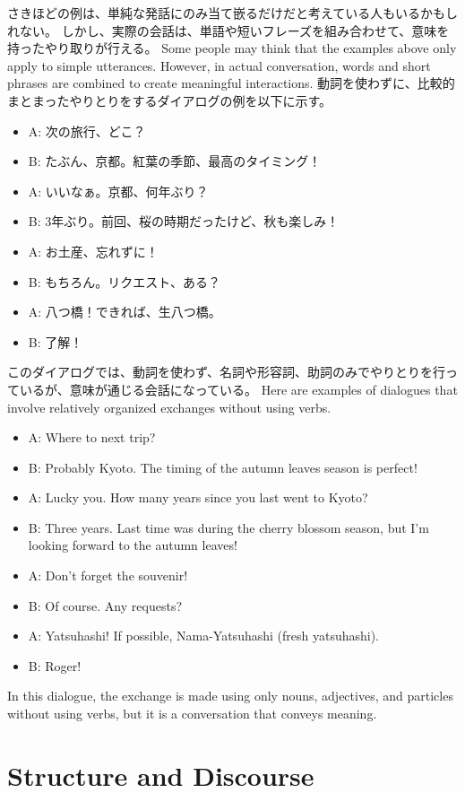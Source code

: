 \documentclass[uplatex,dvipdfmx,b5paper,english,10pt]{jsbook}
\begin{document}
\ifJapanese
  さきほどの例は、単純な発話にのみ当て嵌るだけだと考えている人もいるかもしれない。
  しかし、実際の会話は、単語や短いフレーズを組み合わせて、意味を持ったやり取りが行える。
\else
  Some people may think that the examples above only apply to simple utterances.
  However, in actual conversation, words and short phrases are combined to create meaningful interactions.
\fi
\ifJapanese
動詞を使わずに、比較的まとまったやりとりをするダイアログの例を以下に示す。
\begin{itemize}
  \item A: 次の旅行、どこ？
  \item B: たぶん、京都。紅葉の季節、最高のタイミング！
  \item A: いいなぁ。京都、何年ぶり？
  \item B: 3年ぶり。前回、桜の時期だったけど、秋も楽しみ！
  \item A: お土産、忘れずに！
  \item B: もちろん。リクエスト、ある？
  \item A: 八つ橋！できれば、生八つ橋。
  \item B: 了解！
\end{itemize}
このダイアログでは、動詞を使わず、名詞や形容詞、助詞のみでやりとりを行っているが、意味が通じる会話になっている。
\else
Here are examples of dialogues that involve relatively organized exchanges without using verbs.
\begin{itemize}
  \item A: Where to next trip?
  \item B: Probably Kyoto. The timing of the autumn leaves season is perfect!
  \item A: Lucky you. How many years since you last went to Kyoto?
  \item B: Three years. Last time was during the cherry blossom season, but I'm looking forward to the autumn leaves!
  \item A: Don't forget the souvenir!
  \item B: Of course. Any requests?
  \item A: Yatsuhashi! If possible, Nama-Yatsuhashi (fresh yatsuhashi).
  \item B: Roger!
\end{itemize}
In this dialogue, the exchange is made using only nouns, adjectives, and particles without using verbs, but it is a conversation that conveys meaning.
\fi

\ifEnglish
\section{Structure and Discourse}
\else
\end{document}

